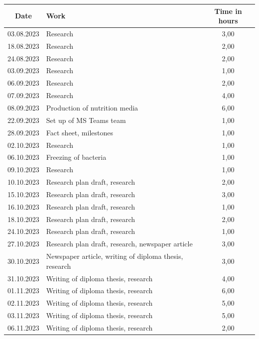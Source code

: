 \begin{longtable}{|c|p{9cm}|c|}
        \hline
        \textbf{Date} & \textbf{Work} & \textbf{Time in hours}  \\ \endhead \hline
        03.08.2023 & Research & 3,00 \\ \hline
        18.08.2023 & Research & 2,00 \\ \hline
        24.08.2023 & Research & 2,00 \\ \hline
        03.09.2023 & Research & 1,00 \\ \hline
        06.09.2023 & Research & 2,00 \\ \hline
        07.09.2023 & Research & 4,00 \\ \hline
        08.09.2023 & Production of nutrition media & 6,00 \\ \hline
        22.09.2023 & Set up of MS Teams team & 1,00 \\ \hline
        28.09.2023 & Fact sheet, milestones & 1,00 \\ \hline
        02.10.2023 & Research & 1,00 \\ \hline
        06.10.2023 & Freezing of bacteria & 1,00 \\ \hline
        09.10.2023 & Research & 1,00 \\ \hline
        10.10.2023 & Research plan draft, research & 2,00 \\ \hline
        15.10.2023 & Research plan draft, research & 3,00 \\ \hline
        16.10.2023 & Research plan draft, research & 1,00 \\ \hline
        18.10.2023 & Research plan draft, research & 2,00 \\ \hline
        24.10.2023 & Research plan draft, research & 1,00 \\ \hline
        27.10.2023 & Research plan draft, research, newspaper article & 3,00 \\ \hline
        30.10.2023 & Newspaper article, writing of diploma thesis, research & 3,00 \\ \hline
        31.10.2023 & Writing of diploma thesis, research & 4,00 \\ \hline
        01.11.2023 & Writing of diploma thesis, research & 6,00 \\ \hline
        02.11.2023 & Writing of diploma thesis, research & 5,00 \\ \hline
        03.11.2023 & Writing of diploma thesis, research & 5,00 \\ \hline
        06.11.2023 & Writing of diploma thesis, research & 2,00 \\ \hline

\end{longtable}
